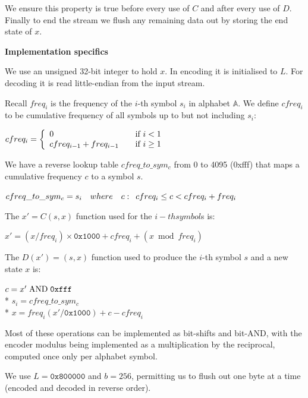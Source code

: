 \documentclass[a4paper]{article}
\begin{document}
We ensure this property is true before every use of $C$ and after every
use of $D$.  Finally to end the stream we flush any remaining data out
by storing the end state of $x$.


\textbf{Implementation specifics}

We use an unsigned 32-bit integer to hold $x$. In encoding it is
initialised to $L$. For decoding it is read little-endian from the
input stream.

Recall $freq_{i}$ is the frequency of the $i$-th symbol $s_{i}$ in alphabet
$\mathbb{A}$.  We define $cfreq_i$ to be cumulative frequency of all symbols
up to but not including $s_{i}$:

{
\setlength{\parindent}{1cm}
$ cfreq_{i} = \left\{
\begin{array}{l l}
0 & \quad \textrm{if $i < 1$} \\
cfreq_{i-1} + freq_{i-1} & \quad \textrm{if $i \geq 1$}
\end{array}
\right. $
}


We have a reverse lookup table $cfreq\_to\_sym_c$ from 0 to 4095
(0xfff) that maps a cumulative frequency $c$ to a symbol $s$.

{
\setlength{\parindent}{1cm}
\indent   $cfreq\_to\_sym_c = s_{i} \quad where \quad c: \enskip cfreq_i \leq c <
cfreq_i + freq_i$
}


The $x' = C(s,x)$ function used for the ${i}-th symbol ${s} is:

{
\setlength{\parindent}{1cm}
\indent    $x' = (x/freq_i) \times \mathtt{0x1000} + cfreq_i + (x \bmod freq_i)$
}

The $D(x') = (s,x)$ function used to produce the $i$-th symbol $s$ and
a new state $x$ is:

{
\setlength{\parindent}{1cm}
\indent    $c = x' \bitand \mathtt{0xfff}$\\*
\indent    $s_{i} = cfreq\_to\_sym_{c}$\\*
\indent    $x = freq_{i} (x' / \mathtt{0x1000}) + c - cfreq_{i}$
}

Most of these operations can be implemented as bit-shifts and bit-AND,
with the encoder modulus being implemented as a multiplication by the
reciprocal, computed once only per alphabet symbol.

We use $L = \mathtt{0x800000}$ and $b = 256$, permitting us to flush out one byte
at a time (encoded and decoded in reverse order).
\end{document}
